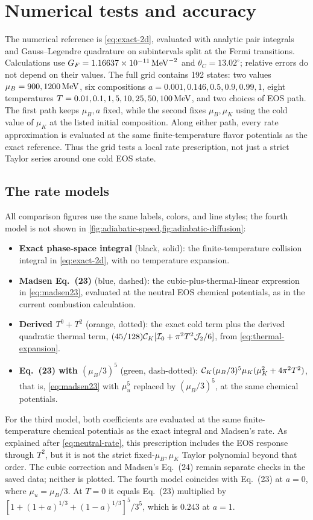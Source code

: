 \section{Numerical tests and accuracy}
\label{sec:numerics}
The numerical reference is \cref{eq:exact-2d}, evaluated with analytic pair integrals and Gauss--Legendre quadrature on subintervals split at the Fermi transitions.
Calculations use \(G_F=1.16637\times10^{-11}\,\mathrm{MeV}^{-2}\) and \(\theta_C=13.02^\circ\); relative errors do not depend on their values.
The full grid contains 192 states: two values \(\mu_B=900,1200\,\mathrm{MeV}\), six compositions \(a=0.001,0.146,0.5,0.9,0.99,1\), eight temperatures \(T=0.01,0.1,1,5,10,25,50,100\,\mathrm{MeV}\), and two choices of EOS path.
The first path keeps \(\mu_B,a\) fixed, while the second fixes \(\mu_B,\mu_K\) using the cold value of \(\mu_K\) at the listed initial composition.
Along either path, every rate approximation is evaluated at the same finite-temperature flavor potentials as the exact reference.
Thus the grid tests a local rate prescription, not just a strict Taylor series around one cold EOS state.

\subsection{The rate models}
All comparison figures use the same labels, colors, and line styles; the fourth model is not shown in \cref{fig:adiabatic-speed,fig:adiabatic-diffusion}:
\begin{itemize}
 \item \textbf{Exact phase-space integral} (black, solid): the finite-temperature collision integral in \cref{eq:exact-2d}, with no temperature expansion.
 \item \textbf{Madsen Eq.~(23)} (blue, dashed): the cubic-plus-thermal-linear expression in \cref{eq:madsen23}, evaluated at the neutral EOS chemical potentials, as in the current combustion calculation.
 \item \textbf{Derived \(T^0+T^2\)} (orange, dotted): the exact cold term plus the derived quadratic thermal term, \((45/128)\mathcal C_K[\mathcal I_0+\pi^2T^2\mathcal J_2/6]\), from \cref{eq:thermal-expansion}.
 \item \textbf{Eq.~(23) with \((\mu_B/3)^5\)} (green, dash-dotted): \(\mathcal C_K(\mu_B/3)^5\mu_K(\mu_K^2+4\pi^2T^2)\), that is, \cref{eq:madsen23} with \(\mu_u^5\) replaced by \((\mu_B/3)^5\), at the same chemical potentials.
\end{itemize}
For the third model, both coefficients are evaluated at the same finite-temperature chemical potentials as the exact integral and Madsen's rate.
As explained after \cref{eq:neutral-rate}, this prescription includes the EOS response through \(T^2\), but it is not the strict fixed-\(\mu_B,\mu_K\) Taylor polynomial beyond that order.
The cubic correction and Madsen's Eq.~(24) remain separate checks in the saved data; neither is plotted.
The fourth model coincides with Eq.~(23) at \(a=0\), where \(\mu_u=\mu_B/3\).
At \(T=0\) it equals Eq.~(23) multiplied by \([1+(1+a)^{1/3}+(1-a)^{1/3}]^5/3^5\), which is \(0.243\) at \(a=1\).


